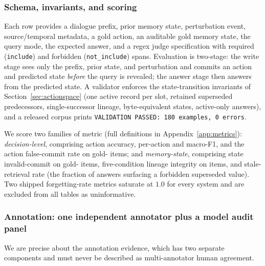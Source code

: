 \subsubsection{Schema, invariants, and scoring}

Each row provides a dialogue prefix, prior memory state, perturbation event,
source/temporal metadata, a gold action, an auditable gold memory state, the
query mode, the expected answer, and a regex judge specification with required
(\texttt{include}) and forbidden (\texttt{not\_include}) spans. Evaluation is
two-stage: the write stage sees only the prefix, prior state, and perturbation
and commits an action and predicted state \emph{before} the query is revealed;
the answer stage then answers from the predicted state. A validator enforces the
state-transition invariants of Section~\ref{sec:actionspace} (one active record
per slot, retained superseded predecessors, single-successor lineage,
byte-equivalent \abstain{} states, active-only answers), and a released corpus
prints \texttt{VALIDATION PASSED: 180 examples, 0 errors}.

We score two families of metric (full definitions in Appendix~\ref{app:metrics}):
\emph{decision-level}, comprising action accuracy, per-action and macro-F1, and
the action false-commit rate on gold-\abstain{} items; and \emph{memory-state},
comprising state invalid-commit on gold-\abstain{} items, five-condition lineage
integrity on \supersede{} items, and stale-retrieval rate (the fraction of answers surfacing a forbidden
superseded value). Two shipped forgetting-rate metrics saturate at $1.0$ for every
system and are excluded from all tables as uninformative.

\subsubsection{Annotation: one independent annotator plus a model audit panel}
\label{sec:annotation}

We are precise about the annotation evidence, which has two separate components
and must never be described as multi-annotator human agreement.

